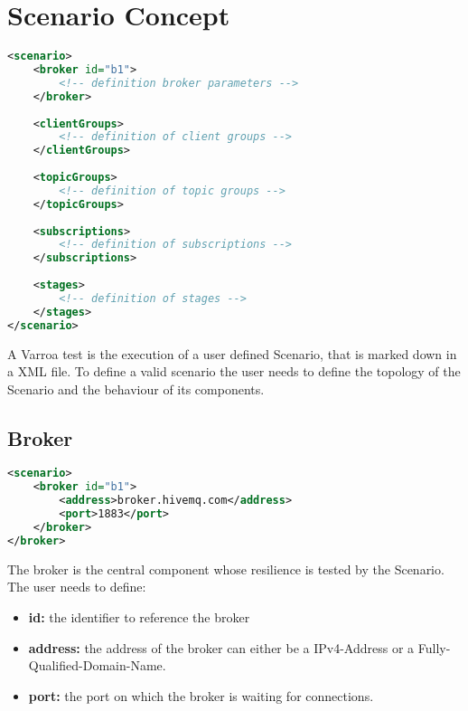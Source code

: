 \chapter{Scenario Concept}



\begin{lstlisting}[caption={XML Definition of the Scenario}, captionpos=b, label={lst:scenario}, language=XML]
<scenario>
	<broker id="b1">
		<!-- definition broker parameters -->
	</broker>
	
	<clientGroups>
		<!-- definition of client groups -->
	</clientGroups>
	
	<topicGroups>
		<!-- definition of topic groups -->
	</topicGroups>
	
	<subscriptions>
		<!-- definition of subscriptions -->
	</subscriptions>
	
	<stages>
		<!-- definition of stages -->
	</stages>
</scenario>
\end{lstlisting}

A Varroa test is the execution of a user defined Scenario, that is marked down in a XML file.
To define a valid scenario the user needs to define the topology of the Scenario and the behaviour of its components.

\section{Broker}
\begin{lstlisting}[caption={XML definition of the Broker}, captionpos=b, label={lst:broker}, language=XML]
<scenario>
	<broker id="b1">
		<address>broker.hivemq.com</address>
		<port>1883</port>
	</broker>
</broker>
\end{lstlisting}
The broker is the central component whose resilience is tested by the Scenario.
The user needs to define:
\begin{itemize}
	\item \textbf{id:} the identifier to reference the broker
	\item \textbf{address:} the address of the broker can either be a IPv4-Address or a Fully-Qualified-Domain-Name.
	\item \textbf{port:} the port on which the broker is waiting for connections.
\end{itemize}

